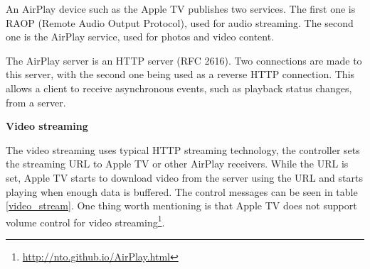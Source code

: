 An AirPlay device such as the Apple TV publishes two services. The first one is 
RAOP (Remote Audio Output Protocol), used for audio streaming. The second 
one is the AirPlay service, used for photos and video content.

The AirPlay server is an HTTP server (RFC 2616). Two connections are made to this 
server, with the second one being used as a reverse HTTP connection. This allows a 
client to receive asynchronous events, such as playback status changes, from a 
server.

\textbf{Video streaming}

The video streaming uses typical HTTP streaming technology, the controller sets 
the streaming URL to Apple TV or other AirPlay receivers. While the URL is set, 
Apple TV starts to download video from the server using the URL and starts 
playing when enough data is buffered. The control messages can be seen in 
table \ref{video_stream}. One thing worth mentioning is that Apple TV does
not support volume control for video
streaming\footnote{\url{http://nto.github.io/AirPlay.html}}.


\begin{table}[htb] 
\caption{AirPlay Video Control HTTP requests \label{video_stream}} 
\begin{center} 
\end{center} 
\end{table} 

